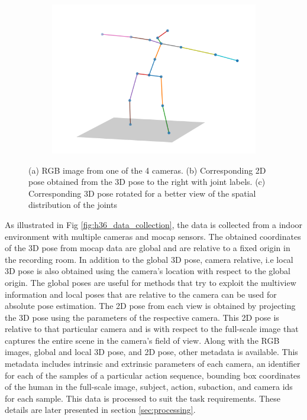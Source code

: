 \begin{figure}
\begin{subfigure}[b]{0.3\textwidth}
        \caption{}
    \end{subfigure}
    \hfill
    \begin{subfigure}[b]{0.3\textwidth}
        \centering
        \includegraphics[width=\textwidth]{figures/h36_viz/h363d.png}
        \caption{}
    \end{subfigure}

    \caption{(a) RGB image from one of the 4 cameras. (b) Corresponding 2D pose obtained from the 3D pose to the right with joint labels. (c) Corresponding 3D pose rotated for a better view of the spatial distribution of the joints}

    \label{fig:h36_sample}
\end{figure}

As illustrated in Fig \ref{fig:h36_data_collection}, the data is collected from a indoor environment with multiple cameras and \ac{mocap} sensors. The obtained coordinates of the 3D pose from \ac{mocap} data are global and are relative to a fixed origin in the recording room. In addition to the global 3D pose, camera relative, i.e local 3D pose is also obtained using the camera's location with respect to the global origin. The global poses are useful for methods that try to exploit the multiview information and local poses that are relative to the camera can be used for absolute pose estimation. The 2D pose from each view is obtained by projecting the 3D pose using the parameters of the respective camera. This 2D pose is relative to that particular camera and is with respect to the full-scale image that captures the entire scene in the camera's field of view. Along with the RGB images, global and local 3D pose, and 2D pose, other metadata is available. This metadata includes intrinsic and extrinsic parameters of each camera, an identifier for each of the samples of a particular action sequence, bounding box coordinates of the human in the full-scale image, subject, action, subaction, and camera ids for each sample. This data is processed to suit the task requirements. These details are later presented in section \ref{sec:processing}.

